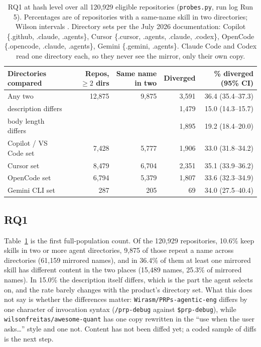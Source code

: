 \documentclass[10pt]{article}
\begin{document}
\begin{table}[t]
\centering\small
\begin{tabular}{lrrrr}
\toprule
Directories compared & Repos, $\geq 2$ dirs & Same name in two & Diverged & \% diverged (95\% CI) \\
\midrule
Any two & 12,875 & 9,875 & 3,591 & 36.4 (35.4--37.3) \\
\quad description differs & & & 1,479 & 15.0 (14.3--15.7) \\
\quad body length differs & & & 1,895 & 19.2 (18.4--20.0) \\
Copilot / VS Code set & 7,428 & 5,777 & 1,906 & 33.0 (31.8--34.2) \\
Cursor set & 8,479 & 6,704 & 2,351 & 35.1 (33.9--36.2) \\
OpenCode set & 6,794 & 5,379 & 1,807 & 33.6 (32.3--34.9) \\
Gemini CLI set & 287 & 205 & 69 & 34.0 (27.5--40.4) \\
\bottomrule
\end{tabular}
\caption{RQ1 at hash level over all 120,929 eligible repositories (\texttt{probes.py}, run log Run 5). Percentages are of
repositories with a same-name skill in two directories; Wilson intervals \cite{wilson1927}. Directory sets per the July
2026 documentation: Copilot \{.github, .claude, .agents\}, Cursor \{.cursor, .agents, .claude, .codex\}, OpenCode
\{.opencode, .claude, .agents\}, Gemini \{.gemini, .agents\}. Claude Code and Codex read one directory each, so they
never see the mirror, only their own copy.}
\label{tab:rq1}
\end{table}

\subsection{RQ1}
Table~\ref{tab:rq1} is the first full-population count. Of the 120,929 repositories, 10.6\% keep skills in two or
more agent directories, 9,875 of those repeat a name across directories (61,159 mirrored names), and in 36.4\% of them at
least one mirrored skill has different content in the two places (15,489 names, 25.3\% of mirrored names). In 15.0\%
the description itself differs, which is the part the agent selects on, and the rate barely changes with the product's
directory set. What this does not say is whether the differences matter: \texttt{Wirasm/PRPs-agentic-eng} differs by one
character of invocation syntax (\texttt{/prp-debug} against \texttt{\$prp-debug}), while
\texttt{wilsonfreitas/awesome-quant} has one copy rewritten in the ``use when the user asks\ldots'' style and one not.
Content has not been diffed yet; a coded sample of diffs is the next step.
\end{document}
